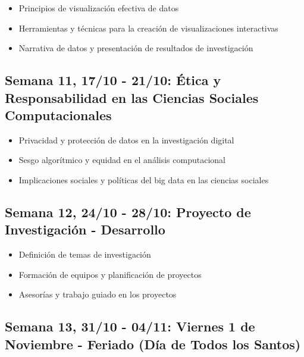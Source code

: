 \documentclass[11pt,letter,]{article}
\providecommand{\tightlist}{%
  \setlength{\itemsep}{0pt}\setlength{\parskip}{0pt}}
\begin{document}
\begin{itemize}
\tightlist
\item
  Principios de visualización efectiva de datos
\item
  Herramientas y técnicas para la creación de visualizaciones
  interactivas
\item
  Narrativa de datos y presentación de resultados de investigación
\end{itemize}

\hypertarget{semana-11-1710---2110-uxe9tica-y-responsabilidad-en-las-ciencias-sociales-computacionales}{%
\subsection{Semana 11, 17/10 - 21/10: Ética y Responsabilidad en las
Ciencias Sociales
Computacionales}\label{semana-11-1710---2110-uxe9tica-y-responsabilidad-en-las-ciencias-sociales-computacionales}}

\begin{itemize}
\tightlist
\item
  Privacidad y protección de datos en la investigación digital
\item
  Sesgo algorítmico y equidad en el análisis computacional
\item
  Implicaciones sociales y políticas del big data en las ciencias
  sociales
\end{itemize}

\hypertarget{semana-12-2410---2810-proyecto-de-investigaciuxf3n---desarrollo}{%
\subsection{Semana 12, 24/10 - 28/10: Proyecto de Investigación -
Desarrollo}\label{semana-12-2410---2810-proyecto-de-investigaciuxf3n---desarrollo}}

\begin{itemize}
\tightlist
\item
  Definición de temas de investigación
\item
  Formación de equipos y planificación de proyectos
\item
  Asesorías y trabajo guiado en los proyectos
\end{itemize}

\hypertarget{semana-13-3110---0411-viernes-1-de-noviembre---feriado-duxeda-de-todos-los-santos}{%
\subsection{Semana 13, 31/10 - 04/11: Viernes 1 de Noviembre - Feriado
(Día de Todos los
Santos)}\label{semana-13-3110---0411-viernes-1-de-noviembre---feriado-duxeda-de-todos-los-santos}}
\end{document}
